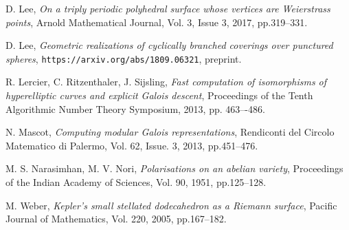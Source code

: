 \documentclass[12pt,reqno]{amsart}
\theoremstyle{definition}
\theoremstyle{remark}
\begin{document}
\begin{thebibliography}{20}
D. Lee,
\textit{On a triply periodic polyhedral surface whose vertices are Weierstrass points},
Arnold Mathematical Journal, 
Vol. 3, Issue 3, 2017, pp.319--331.

D. Lee, 
\textit{Geometric realizations of cyclically branched coverings over punctured spheres},
\texttt{https://arxiv.org/abs/1809.06321}, preprint.

R. Lercier, C. Ritzenthaler, J. Sijsling,
\textit{Fast computation of isomorphisms of hyperelliptic curves and explicit Galois descent},
Proceedings of the Tenth Algorithmic Number Theory Symposium, 2013, pp. 463–-486.

N. Mascot,
\textit{Computing modular Galois representations},
Rendiconti del Circolo Matematico di Palermo,
Vol. 62, Issue. 3, 2013, pp.451--476.

M. S. Narasimhan, M. V. Nori,
\textit{Polarisations on an abelian variety},
Proceedings of the Indian Academy of Sciences,
Vol. 90, 1951, pp.125--128.


M. Weber,
\textit{Kepler's small stellated dodecahedron as a Riemann surface},
Pacific Journal of Mathematics, 
Vol. 220, 2005, pp.167--182.


\end{thebibliography}
\end{document}
